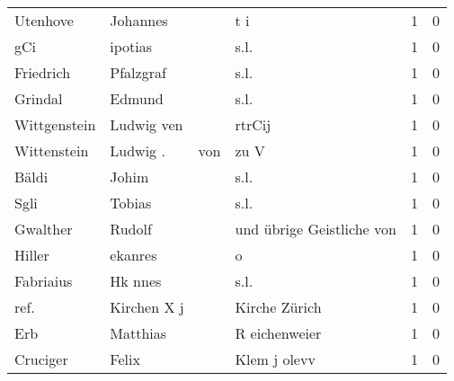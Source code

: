 \begin{tabular}{llllrr}
                 Utenhove &                           Johannes &             &                                         t i &          1 &         0 \\
                      gCi &                            ipotias &             &                                        s.l. &          1 &         0 \\
                Friedrich &                          Pfalzgraf &             &                                        s.l. &          1 &         0 \\
                  Grindal &                             Edmund &             &                                        s.l. &          1 &         0 \\
             Wittgenstein &                         Ludwig ven &             &                                      rtrCij &          1 &         0 \\
              Wittenstein &                           Ludwig . &         von &                                        zu V &          1 &         0 \\
                    Bäldi &                              Johim &             &                                        s.l. &          1 &         0 \\
                     Sgli &                             Tobias &             &                                        s.l. &          1 &         0 \\
                 Gwalther &                             Rudolf &             &                   und übrige Geistliche von &          1 &         0 \\
                   Hiller &                            ekanres &             &                                           o &          1 &         0 \\
                Fabriaius &                            Hk nnes &             &                                        s.l. &          1 &         0 \\
                     ref. &                        Kirchen X j &             &                               Kirche Zürich &          1 &         0 \\
                      Erb &                           Matthias &             &                               R eichenweier &          1 &         0 \\
                 Cruciger &                              Felix &             &                                Klem j olevv &          1 &         0 \\

\end{tabular}
